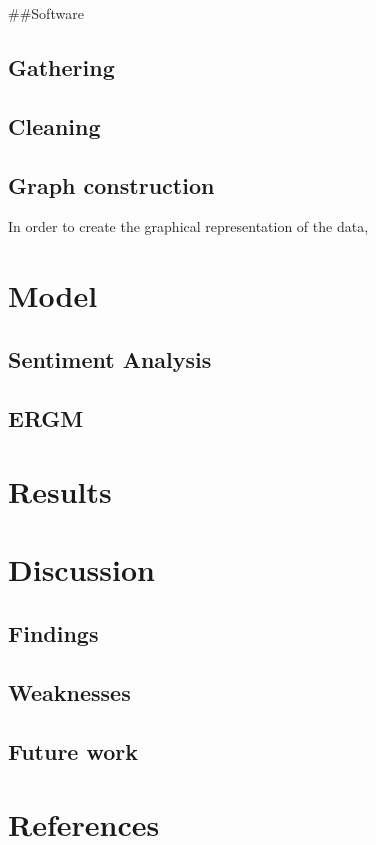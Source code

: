 \documentclass[
]{article}
\newlength{\cslhangindent}
\newlength{\cslentryspacingunit} %
\newenvironment{CSLReferences}[2] %
 {%
  \setlength{\parindent}{0pt}
  \ifodd #1
  \let\oldpar\par
  \def\par{\hangindent=\cslhangindent\oldpar}
  \fi
  \setlength{\parskip}{#2\cslentryspacingunit}
 }%
 {}
\begin{document}
\#\#Software

\hypertarget{gathering}{%
\subsection{Gathering}\label{gathering}}

\hypertarget{cleaning}{%
\subsection{Cleaning}\label{cleaning}}

\hypertarget{graph-construction}{%
\subsection{Graph construction}\label{graph-construction}}

In order to create the graphical representation of the data,

\hypertarget{model}{%
\section{Model}\label{model}}

\hypertarget{sentiment-analysis}{%
\subsection{Sentiment Analysis}\label{sentiment-analysis}}

\hypertarget{ergm}{%
\subsection{ERGM}\label{ergm}}

\hypertarget{results}{%
\section{Results}\label{results}}

\hypertarget{discussion}{%
\section{Discussion}\label{discussion}}

\hypertarget{findings}{%
\subsection{Findings}\label{findings}}

\hypertarget{weaknesses}{%
\subsection{Weaknesses}\label{weaknesses}}

\hypertarget{future-work}{%
\subsection{Future work}\label{future-work}}

\newpage

\hypertarget{references}{%
\section{References}\label{references}}

\hypertarget{refs}{}
\begin{CSLReferences}{0}{0}
\end{CSLReferences}
\end{document}
